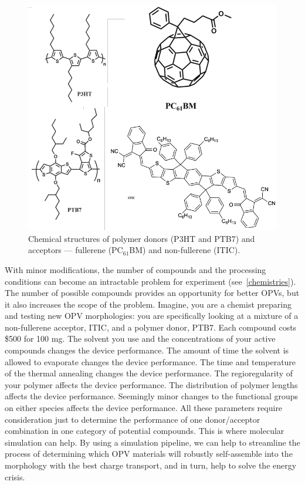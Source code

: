\begin{figure}
    \centering
    \includegraphics[width=\linewidth]{images/chem_structures.pdf}
    \caption{Chemical structures of polymer donors (P3HT and PTB7) and acceptors --- fullerene (PC$_{61}$BM) and non-fullerene (ITIC).}\label{chemistries}
\end{figure}
\noindent With minor modifications, the number of compounds and the processing conditions can become an intractable problem for experiment (see~\autoref{chemistries}).
The number of possible compounds provides an opportunity for better OPVs, but it also increases the scope of the problem.
Imagine, you are a chemist preparing and testing new OPV morphologies: you are specifically looking at a mixture of a non-fullerene acceptor, ITIC, and a polymer donor, PTB7. 
Each compound costs \$500 for 100 mg\cite{sigmaaldrich}.
The solvent you use and the concentrations of your active compounds changes the device performance\cite{Hoppe2004a}.
The amount of time the solvent is allowed to evaporate changes the device performance\cite{Li2007}.
The time and temperature of the thermal annealing changes the device performance\cite{Ma2005}.
The regioregularity of your polymer affects the device performance\cite{Kim2006}.
The distribution of polymer lengths affects the device performance\cite{Zhao2013b}.
Seemingly minor changes to the functional groups on either species affects the device performance\cite{Swick2019a}.
All these parameters require consideration just to determine the performance of one donor/acceptor combination in one category of potential compounds\cite{Dou2013}.
This is where molecular simulation can help.
By using a simulation pipeline, we can help to streamline the process of determining which OPV materials will robustly self-assemble into the morphology with the best charge transport, and in turn, help to solve the energy crisis.

